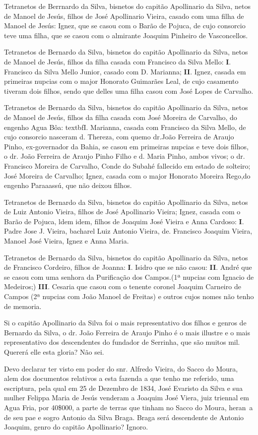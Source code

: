 Tetranetos de Berrnardo da Silva, bisnetos do capitão Apollinario da Silva, netos de Manoel de Jesús, filhos de José Apollinario Vieira, casado com uma filha de Manoel de Jesús: Ignez, que se casou com o Barão de Pojuca, de cujo consorcio teve uma filha, que se casou com o almirante Joaquim Pinheiro de Vasconcellos.

Tetranetos de Bernardo da Silva, bisnetos do capitão Apollinario da Silva, netos de Manoel de Jesús, filhos da filha casada com Francisco da Silva Mello: \textbf{I}. Francisco da Silva Mello Junior, casado com D. Marianna; \textbf{II}. Ignez, casada em primeiras nupcias com o major Honorato Guimarães Leal, de cujo casamento tiveram dois filhos, sendo que delles uma filha casou com José Lopes de Carvalho.

Tetranetos de Bernardo da Silva, bisnetos do capitão Apollinario da Silva, netos de Manoel de Jesús, filhos da filha casada com José Moreira de Carvalho, do engenho Agua Bôa: textbf{I}. Marianna, casada com Francisco da Silva Mello, de cujo consorcio nasceram d. Thereza, com quemo dr.João Ferreira de Araujo Pinho, ex-governador da Bahia, se casou em primeiras nupcias e teve dois filhos, o dr. João Ferreira de Araujo Pinho Filho e d. Maria Pinho, ambos vivos; o dr. Francisco Moreira de Carvalho, Conde do Subahé fallecido em estado de solteiro; José Moreira de Carvalho; Ignez, casada com o major Honorato Moreira Rego,do engenho Paraaassú, que não deixou filhos.

Tetranetos de Bernardo da Silva, bisnetos do capitão Apollinario da Silva, netos de Luiz Antonio Vieira, filhos de José Apollinario Vieira; Ignez, casada com o Barão de Pojuca, ldem idem, filhos de Joaquim José Vieira e Anna Cardoso: \textbf{I}. Padre Jose J. Vieira, bacharel Luiz Antonio Vieira, de. Francisco Joaquim Vieira, Manoel José Vieira, Ignez e Anna Maria.

Tetranetos de Bernardo da Silva, bisnetos do capitão Apollinario da Silva, netos de Francisco Cordeiro, filhos de Joanna: \textbf{I}. Isidro que se não casou: \textbf{II}. André que se casou com uma senhora da Purificação dos Campos.(1ª nupcias com Ignacio de Medeiros;) \textbf{III}. Cesaria que casou com o tenente coronel Joaquim Carneiro de Campos (2ª nupcias com João Manoel de Freitas) e outros cujos nomes não tenho de memoria.

Si o capitão Apollinario da Silva foi o mais representativo dos filhos e genros de Bernardo da Silva, o dr. João Ferreira de Araujo Pinho é o mais illustre e o mais representativo dos descendentes do fundador de Serrinha, que são muitos mil. Quererá elle esta gloria? Não sei.

Devo declarar ter visto em poder do snr. Alfredo Vieira, do Sacco do Moura, alem dos documentos relativos a esta fazenda a que tenho me referido, uma escriptura, pela qual em 25 de Dezembro de 1834, José Evaristo da Silva e sua mulher Felippa Maria de Jesús venderam a Joaquim José Viera, juiz triennal em Agua Fria, por 40\$000, a parte de terras que tinham no Sacco do Moura, heran~a de seu pae e sogro Antonio da Silva Braga. Braga  será descendente de Antonio Joaquim, genro do capitão Apollinario? Ignoro.


